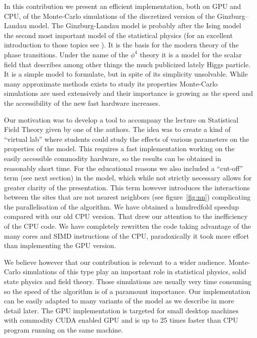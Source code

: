 \documentclass[a4paper]{llncs}
\begin{document}
In this contribution we present an efficient
implementation,  both on GPU and CPU, of the Monte-Carlo simulations of the 
discretized version of the Ginzburg--Landau model. 
The Ginzburg-Landau model is probably after the Ising model the second
most important model of the statistical physics (for an excellent
introduction to those topics see \cite{binney}). It is the basis for
the modern theory of the phase transitions. Under the name of the
$\phi^4$ theory it is a model for the scalar field that describes
among other things the much publicized lately Higgs particle.  It is a
simple model to formulate, but in spite of its simplicity
unsolvable. While many approximate methods exists to study its
properties Monte-Carlo simulations are used extensively and their
importance is growing as the speed and the accessibility of the new
fast hardware increases.  


Our motivation was to develop a tool to accompany the lecture on
Statistical Field Theory given by one of the authors. The idea was to
create a kind of ``virtual lab'' where students could study the
effects of various parameters on the properties of the model. This
requires a fast implementation working on the easily accessible
commodity hardware, so the results can be obtained in reasonably short
time. For the educational reasons we also included a ``cut-off'' term
(see next section) in the model, which while not strictly necessary
allows for greater clarity of the presentation. This term however
introduces the interactions between the sites that are not nearest
neighbors (see figure~\ref{fig:nn}) complicating the parallelisation
of the algorithm.  We have obtained a hundredfold speedup compared
with our old CPU version.  That drew our attention to the inefficiency
of the CPU code. We have completely rewritten the code taking
advantage of the many cores and SIMD instructions of the CPU,
paradoxically it took more effort than implementing the GPU version.

We believe however that our contribution is relevant to a wider
audience.  Monte-Carlo simulations of this type play an important role
in statistical physics, solid state physics and field theory.  Those
simulations are usually very time consuming so the speed of the
algorithm is of a paramount importance.  Our implementation can be
easily adapted to many variants of the model as we describe in more
detail later. The GPU implementation is targeted for small
desktop machines with commodity CUDA enabled GPU and is up to 25 times
faster than CPU program running on the same machine. 
\end{document}
